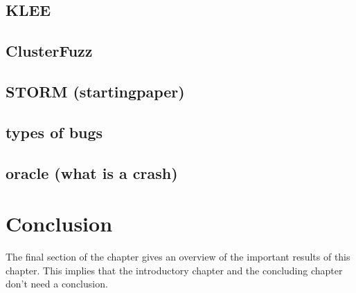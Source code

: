\subsection{KLEE}
\subsection{ClusterFuzz}
\subsection{STORM (startingpaper)}

\subsection{types of bugs} \cite{1mansur2020detecting}

\subsection{oracle (what is a crash)}

\section{Conclusion}
The final section of the chapter gives an overview of the important results
of this chapter. This implies that the introductory chapter and the
concluding chapter don't need a conclusion.


